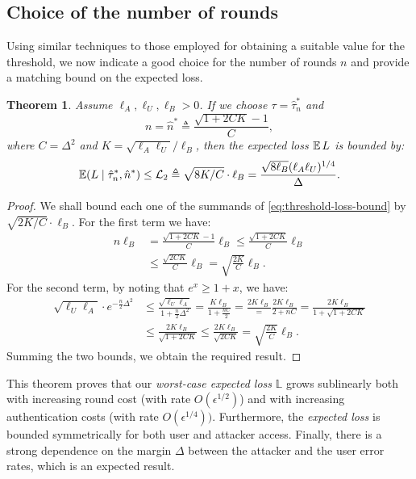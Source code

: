 \documentclass[a4paper]{article}
\newenvironment{IEEEproof}{\begin{proof}}{\end{proof}}
\newcommand \techreport[1]{#1}
\newcommand \defn {\mathrel{\triangleq}}
\newcommand \ELb {\mathcal{L}}
\newcommand\E{\mathop{\mbox{\ensuremath{\mathbb{E}}}}\nolimits}
\newcommand \thr {\tau}
\newcommand \hthr {\hat{\thr}_n^*}
\newcommand \hns {\hat{n}^*}
\newcommand \loss {L}
\newcommand \worst {\mathbb{L}}
\newcommand \LA {\ell_A}
\newcommand \LU {\ell_U}
\newcommand \LB {\ell_B}
\theoremstyle{plain} \newtheorem{remark}{Remark}
\theoremstyle{plain} \newtheorem{definition}{Definition}
\theoremstyle{plain} \newtheorem{example}{Example}
\theoremstyle{plain} \newtheorem{assumption}{Assumption}
\theoremstyle{plain} \newtheorem{conjecture}{Conjecture}
\theoremstyle{plain} \newtheorem{theorem}{Theorem}
\theoremstyle{plain} \newtheorem{proposition}{Proposition}
\theoremstyle{plain} \newtheorem{lemma}{Lemma}
\theoremstyle{plain} \newtheorem{corollary}{Corollary}
\begin{document}
\subsection{Choice of the number of rounds}
\label{sec:rounds-choice}
Using similar techniques to those employed for obtaining a suitable
value for the threshold, we now indicate a good choice for the number
of rounds $n$ and provide a matching bound on the expected loss.
\begin{theorem}
  Assume $\LA, \LU, \LB > 0$. If we choose $\thr = \hthr$
  and
  \begin{equation}
    n = \hns \defn \frac{\sqrt{1 + 2CK} - 1}{C},
    \label{eq:opt-rounds}
  \end{equation}
  where $C = \Delta^2$ and $K = \sqrt{\LA\LU}/\LB$, then the expected
  loss $\E \loss$ is bounded by:
  \begin{equation}
    \E (\loss \mid \hthr, \hns) \leq \ELb_2 \defn \sqrt{8K/C} \cdot \LB
    =
    \frac{\sqrt{8 \LB} (\LA\LU)^{1/4}}{\Delta}.
    \label{eq:loss-opt-rounds}
  \end{equation}
  \label{the:rounds}
\end{theorem}
\begin{IEEEproof}
  We shall bound each one of the summands of \eqref{eq:threshold-loss-bound}
  by $\sqrt{2K/C}\cdot \LB$.
For the first term we have:
  \begin{align*}
    n\LB &= \frac{\sqrt{1 + 2CK} - 1}{C} \LB
    \leq
    \frac{\sqrt{1 + 2CK}}{C} \LB
    \\
    &\leq
    \frac{\sqrt{2CK}}{C} \LB
    =
    \sqrt{\frac{2K}{C}} \LB.
  \end{align*}
  For the second term, by noting that $e^x \geq 1 + x$, we have:
  \begin{align*}
     \sqrt{\LU\LA} 
     \cdot e^{-\frac{n}{2}\Delta^2}
     &\leq
     \frac{\sqrt{\LU\LA}}
     {1+\frac{n}{2}\Delta^2}
     =
     \frac{K\LB}
     {1+\frac{nC}{2}}
     \techreport{=
       \frac{2K\LB}
     =
     \frac{2K\LB}
     {2 + nC}
   }
     =
     \frac{2K\LB}
     {1 + \sqrt{1 + 2CK}}
     \\
     &\leq
     \frac{2K\LB}
     {\sqrt{1 + 2CK}}
     \leq
     \frac{2K\LB}
     {\sqrt{2CK}}
     =
     \sqrt{\frac{2K}{C}} \LB.
  \end{align*}
  Summing the two bounds, we obtain the required result.
\end{IEEEproof}

This theorem proves that our {\em worst-case expected loss} $\worst$
grows sublinearly both with increasing round cost (with rate
$O(\epsilon^{1/2})$) and with increasing authentication costs (with
rate $O(\epsilon^{1/4}))$. Furthermore, the {\em expected loss} is
bounded symmetrically for both user and attacker access. Finally,
there is a strong dependence on the margin $\Delta$ between the
attacker and the user error rates, which is an expected result.
\end{document}
